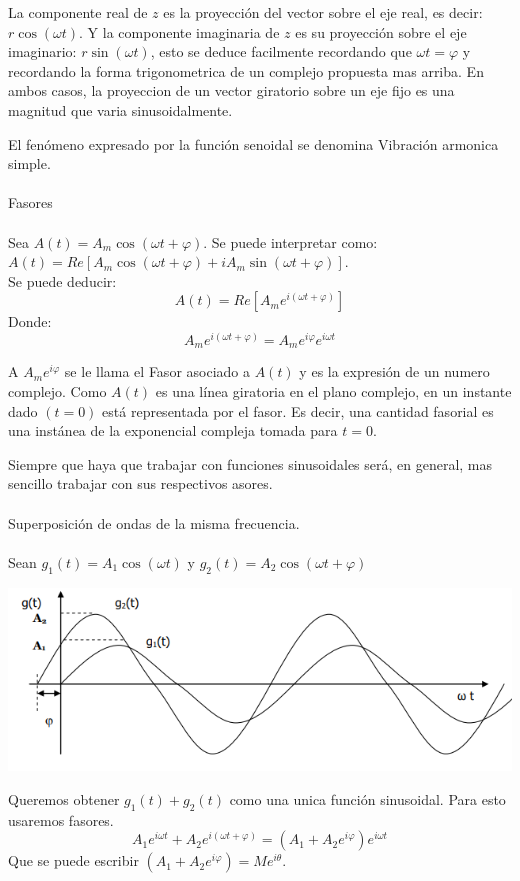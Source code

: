 \documentclass[]{article}
\begin{document}
La componente real de $z$ es la proyección del vector sobre el eje real, es decir: $r\cos(\omega t)$. Y la componente imaginaria de $z$ es su proyección sobre el eje imaginario: $r\sin(\omega t)$, esto se deduce facilmente recordando que $\omega t = \varphi$ y recordando la forma trigonometrica de un complejo propuesta mas arriba. En ambos casos, la proyeccion de un vector giratorio sobre un eje fijo es una magnitud que varia sinusoidalmente.

El fenómeno expresado por la función senoidal se denomina Vibración armonica simple.
\\
\\
\Large Fasores
\normalsize
\\
\\
Sea $A(t) = A_m \cos(\omega t +\varphi)$. Se puede interpretar como: $A(t) = Re[A_m \cos(\omega t +\varphi) + i A_m \sin(\omega t +\varphi)]$.
\\
Se puede deducir: 
$$
A(t) = Re[A_m e^{i(\omega t + \varphi)}]
$$
Donde:
$$
A_m e^{i(\omega t + \varphi)} = A_m e^{i\varphi}e^{i\omega t}
$$

A $A_m e^{i\varphi}$ se le llama el Fasor asociado a $A(t)$ y es la expresión de un numero complejo.
Como $A(t)$ es una línea giratoria en el plano complejo, en un instante dado $(t=0)$ está representada por el fasor. Es decir, una cantidad fasorial es una instánea de la exponencial compleja tomada para $t=0$.

Siempre que haya que trabajar con funciones sinusoidales será, en general, mas sencillo trabajar con sus respectivos asores.
\\
\\
\Large Superposición de ondas de la misma frecuencia.
\normalsize
\\
\\
Sean $g_1(t) = A_1 \cos(\omega t)$ y $g_2(t) = A_2 \cos(\omega t + \varphi)$

\includegraphics{../../../Imagenes/Superior/Complejos/Complejos06.PNG}

Queremos obtener $g_1(t) + g_2(t)$ como una unica función sinusoidal. Para esto usaremos fasores.
$$
A_1 e^{i\omega t} + A_2 e^{i(\omega t +\varphi)} = (A_1 + A_2 e^{i\varphi})e^{i\omega t}
$$
Que se puede escribir $(A_1 + A_2 e^{i\varphi}) = Me^{i\theta}$.
\end{document}

